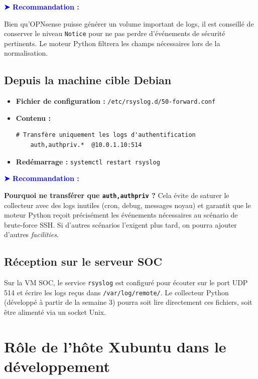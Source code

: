 \documentclass[12pt,a4paper]{article}
\newenvironment{recommandation}{
    \vspace{0.5em}
    \noindent\textbf{\textcolor{blue}{➤ Recommandation :}}\hspace{0.5em}
}{
    \vspace{0.5em}
}
\begin{document}
\begin{recommandation}
Bien qu'OPNsense puisse générer un volume important de logs, il est conseillé de conserver le niveau \texttt{Notice} pour ne pas perdre d'événements de sécurité pertinents. Le moteur Python filtrera les champs nécessaires lors de la normalisation.
\end{recommandation}

\subsection{Depuis la machine cible Debian}

\begin{itemize}
    \item \textbf{Fichier de configuration :} \texttt{/etc/rsyslog.d/50-forward.conf}
    \item \textbf{Contenu :}
    \begin{Verbatim}[frame=single]
    # Transfère uniquement les logs d'authentification
    auth,authpriv.*  @10.0.1.10:514
    \end{Verbatim}
    \item \textbf{Redémarrage :} \texttt{systemctl restart rsyslog}
\end{itemize}

\begin{recommandation}
\textbf{Pourquoi ne transférer que \texttt{auth,authpriv} ?} Cela évite de saturer le collecteur avec des logs inutiles (cron, debug, messages noyau) et garantit que le moteur Python reçoit précisément les événements nécessaires au scénario de brute-force SSH. Si d'autres scénarios l'exigent plus tard, on pourra ajouter d'autres \textit{facilities}.
\end{recommandation}

\subsection{Réception sur le serveur SOC}

Sur la VM SOC, le service \texttt{rsyslog} est configuré pour écouter sur le port UDP 514 et écrire les logs reçus dans \texttt{/var/log/remote/}. Le collecteur Python (développé à partir de la semaine 3) pourra soit lire directement ces fichiers, soit être alimenté via un socket Unix.

\section{Rôle de l'hôte Xubuntu dans le développement}
\end{document}
